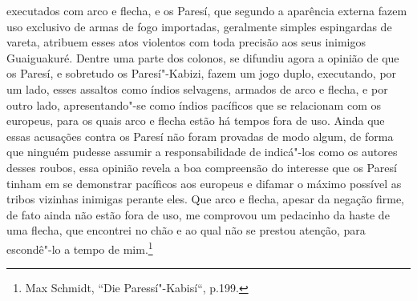 executados com arco e flecha, e os Paresí, que segundo a aparência
externa fazem uso exclusivo de armas de fogo importadas, geralmente
simples espingardas de vareta, atribuem esses atos violentos com toda
precisão aos seus inimigos Guaiguakuré. Dentre uma parte dos colonos,
se difundiu agora a opinião de que os Paresí, e sobretudo os
Paresí"-Kabizi, fazem um jogo duplo, executando, por um lado, esses
assaltos como índios selvagens, armados de arco e flecha, e por outro
lado, apresentando"-se como índios pacíficos que se relacionam com os
europeus, para os quais arco e flecha estão há tempos fora de uso. Ainda
que essas acusações contra os Paresí não foram provadas de modo algum,
de forma que ninguém pudesse assumir a responsabilidade de indicá"-los
como os autores desses roubos, essa opinião revela a boa compreensão do
interesse que os Paresí tinham em se demonstrar pacíficos aos europeus
e difamar o máximo possível as tribos vizinhas inimigas perante eles.
Que arco e flecha, apesar da negação firme, de fato ainda não estão fora
de uso, me comprovou um pedacinho da haste de uma flecha, que encontrei
no chão e ao qual não se prestou atenção, para escondê"-lo a tempo de
mim.\footnote{Max Schmidt, ``Die Paressí"-Kabisí``, p.199.}

